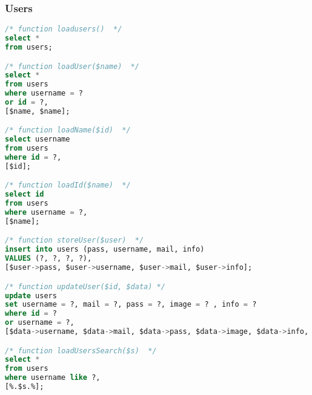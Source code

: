\subsubsection{Users}
\begin{lstlisting}[language=sql]
/* function loadusers()  */
select *
from users;

/* function loadUser($name)  */
select *
from users
where username = ?
or id = ?,
[$name, $name];

/* function loadName($id)  */
select username
from users
where id = ?,
[$id];

/* function loadId($name)  */
select id
from users
where username = ?,
[$name];

/* function storeUser($user)  */
insert into users (pass, username, mail, info)
VALUES (?, ?, ?, ?),
[$user->pass, $user->username, $user->mail, $user->info];

/* function updateUser($id, $data) */
update users
set username = ?, mail = ?, pass = ?, image = ? , info = ?
where id = ?
or username = ?,
[$data->username, $data->mail, $data->pass, $data->image, $data->info, $id, $id];

/* function loadUsersSearch($s)  */
select *
from users
where username like ?,
[%.$s.%];
\end{lstlisting}
